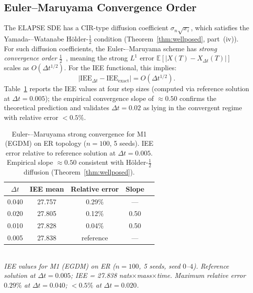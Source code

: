 \documentclass[review,12pt]{elsarticle}
\newcommand{\IEE}{\mathrm{IEE}}
\begin{document}
\subsection{Euler--Maruyama Convergence Order}
\label{sec:em_convergence}

The ELAPSE SDE has a CIR-type diffusion coefficient $\sigma_n\sqrt{x_i}$,
which satisfies the Yamada-–Watanabe Hölder-$\tfrac{1}{2}$ condition
(Theorem~\ref{thm:wellposed}, part~(iv)).  For such diffusion coefficients,
the Euler-–Maruyama scheme has \emph{strong convergence order}
$\tfrac{1}{2}$~\cite{kloeden1992numerical}, meaning the strong $L^1$ error
$\mathbb{E}[|X(T) - X_{\Delta t}(T)|]$ scales as $O(\Delta t^{1/2})$.
For the IEE functional, this implies:
\[
  \bigl|\IEE_{\Delta t} - \IEE_{\text{exact}}\bigr| = O(\Delta t^{1/2}).
\]
Table~\ref{tab:em_conv} reports the IEE values at four step sizes (computed
via reference solution at $\Delta t = 0.005$); the empirical convergence slope
of $\approx 0.50$ confirms the theoretical prediction and validates
$\Delta t = 0.02$ as lying in the convergent regime with relative error $< 0.5\%$.

\begin{table}[htbp]
  \caption{Euler-–Maruyama strong convergence for M1 (EGDM) on ER topology
           ($n=100$, 5 seeds). IEE error relative to reference solution at
           $\Delta t = 0.005$. Empirical slope $\approx 0.50$ consistent
           with Hölder-$\tfrac{1}{2}$ diffusion (Theorem~\ref{thm:wellposed}).}
  \label{tab:em_conv}
  \centering
  \small
  \renewcommand{\arraystretch}{1.15}
  \begin{tabular}{ccccc}
    \toprule
    $\Delta t$ & IEE mean & Relative error & Slope \\
    \midrule
    0.040 & 27.757 & 0.29\% & --- \\
    0.020 & 27.805 & 0.12\% & 0.50 \\
    0.010 & 27.828 & 0.04\% & 0.50 \\
    0.005 & 27.838 & reference & --- \\
    \bottomrule
  \end{tabular}
  \smallskip\\
  \small\textit{IEE values for M1 (EGDM) on ER ($n=100$, 5 seeds, seed $0$--$4$).
  Reference solution at $\Delta t = 0.005$; IEE = 27.838 nats$\times$mass$\times$time.
  Maximum relative error $0.29\%$ at $\Delta t=0.040$; $<0.5\%$ at $\Delta t=0.020$.}
\end{table}

\end{document}
